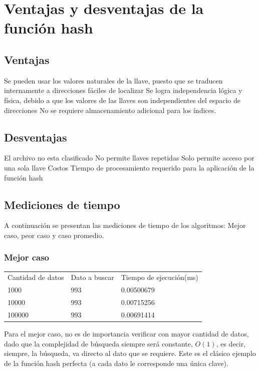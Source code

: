 \documentclass[letterpaper,openright,12pt]{report}
\begin{document}
\section{Ventajas y desventajas de la función hash}
\subsection{Ventajas}

Se pueden usar los valores naturales de la llave, puesto que se traducen
internamente a direcciones fáciles de localizar Se logra independencia
lógica y física, debido a que los valores de las llaves son
independientes del espacio de direcciones No se requiere almacenamiento
adicional para los índices.

\subsection{Desventajas}

El archivo no esta clasificado No permite llaves repetidas Solo permite
acceso por una sola llave Costos Tiempo de procesamiento requerido para
la aplicación de la función hash
\newpage

\subsection{Mediciones de tiempo}
A continuación se presentan las mediciones de tiempo de los algoritmos: Mejor caso, peor caso y caso promedio.

\subsubsection{Mejor caso}
\begin{center}
\begin{table}[h]
\begin{tabular}{lll}
Cantidad de datos & Dato a buscar & Tiempo de ejecución(ms)\\
1000   & 993 & 0.00500679 \\
10000  & 993 & 0.00715256 \\
100000 & 993 & 0.00691414
\end{tabular}
\end{table}
\end{center}
Para el mejor caso, no es de importancia verificar con mayor cantidad de datos, dado que la complejidad de búsqueda siempre será constante, $O(1)$, es decir, siempre, la búsqueda, va directo al dato que se requiere. Este es el clásico ejemplo de la función hash perfecta (a cada dato le corresponde una única clave).
\end{document}
